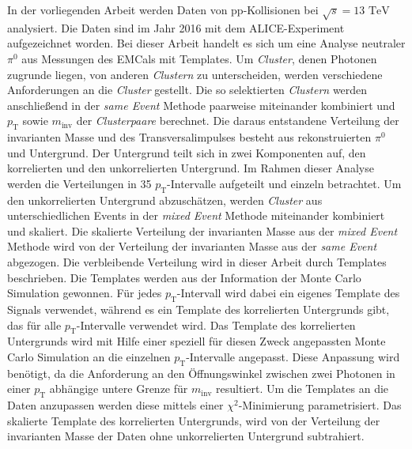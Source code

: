 In der vorliegenden Arbeit werden Daten von pp-Kollisionen bei $\sqrt{s}=13\text{ TeV}$ analysiert.
Die Daten sind im Jahr 2016 mit dem ALICE-Experiment aufgezeichnet worden.
Bei dieser Arbeit handelt es sich um eine Analyse neutraler $\pi^{0}$ aus Messungen des EMCals mit Templates. %
\newline
Um \textit{Cluster}, denen Photonen zugrunde liegen, von anderen \textit{Clustern} zu unterscheiden, werden verschiedene Anforderungen an die \textit{Cluster} gestellt.
Die so selektierten \textit{Clustern} werden anschließend in der \textit{same Event} Methode paarweise miteinander kombiniert und $p_\text{T}$ sowie $m_\text{inv}$ der \textit{Clusterpaare} berechnet.
\newline
Die daraus entstandene Verteilung der invarianten Masse und des Transversalimpulses besteht aus rekonstruierten $\pi^{0}$ und Untergrund.
Der Untergrund teilt sich in zwei Komponenten auf, den kor\-re\-lier\-ten und den unkorrelierten Untergrund.
Im Rahmen dieser Analyse werden die Verteilungen in 35 $p_\text{T}$-Intervalle aufgeteilt und einzeln betrachtet.
\newline
Um den unkorrelierten Untergrund abzuschätzen, werden \textit{Cluster} aus unterschiedlichen Events in der \textit{mixed Event} Methode miteinander kombiniert und skaliert.
Die skalierte Verteilung der invarianten Masse aus der \textit{mixed Event} Methode wird von der Verteilung der invarianten Masse aus der \textit{same Event} abgezogen.
\newline
Die verbleibende Verteilung wird in dieser Arbeit durch Templates beschrieben.
Die Templates werden aus der Information der Monte Carlo Simulation gewonnen.
Für jedes $p_\text{T}$-Intervall wird dabei ein eigenes Template des Signals verwendet, während es ein Template des korrelierten Untergrunds gibt, das für alle $p_\text{T}$-Intervalle verwendet wird.
Das Template des korrelierten Untergrunds wird mit Hilfe einer speziell für diesen Zweck angepassten Monte Carlo Simulation an die einzelnen $p_\text{T}$-Intervalle angepasst.
Diese Anpassung wird benötigt, da die Anforderung an den Öffnungswinkel zwischen zwei Photonen in einer $p_\text{T}$ abhängige untere Grenze für $m_\text{inv}$ resultiert.
\newline
Um die Templates an die Daten anzupassen werden diese mittels einer $\chi^{2}$-Minimierung pa\-ra\-me\-tri\-siert.
Das skalierte Template des korrelierten Untergrunds, wird von der Verteilung der invarianten Masse der Daten ohne unkorrelierten Untergrund subtrahiert.
